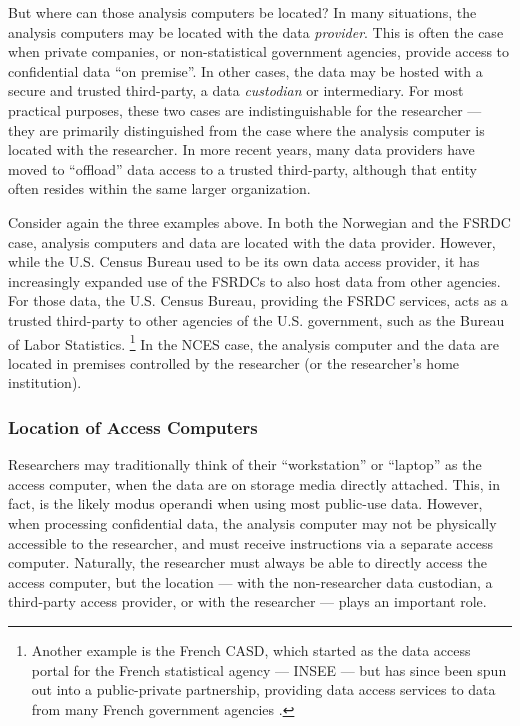 But where can those analysis computers be located? In many situations, the analysis computers may be located with the data \textit{provider}. This is often the case when private companies, or non-statistical government agencies, provide access to confidential data ``on premise''. In other cases, the data may be hosted with a secure and trusted third-party, a data \textit{custodian} or intermediary. For most practical purposes, these two cases are indistinguishable for the researcher --- they are primarily distinguished from the case where the analysis computer is located with the researcher. In more recent years, many data providers have moved to ``offload'' data access to a trusted third-party, although that entity often resides within the same larger organization. 

Consider again the three examples above. In both the Norwegian and the FSRDC case, analysis computers and data are located with the data provider. However, while the U.S. Census Bureau used to be its own data access provider, it has increasingly expanded use of the \acp{FSRDC} to also host data from other agencies. For those data, the U.S. Census Bureau, providing the FSRDC services, acts as a trusted third-party to other agencies of the U.S. government, such as the Bureau of Labor Statistics.%
\footnote{Another example is the French \ac{CASD}, which started as the data access portal for the French statistical agency --- \ac{INSEE} --- but has since been spun out into a public-private partnership, providing data access services to data from many French government agencies \cite{SILBERMAN_2021}.} In the NCES case, the analysis computer and the data are located in premises controlled by the researcher (or the researcher's home institution).

\subsubsection{Location of Access Computers}

Researchers may traditionally think of their ``workstation'' or ``laptop'' as the access computer, when the data are on storage media directly attached. This, in fact, is the likely modus operandi when using most public-use data. However, when processing confidential data,  the analysis computer may not be physically accessible to the researcher, and must receive instructions via a separate access computer. Naturally, the researcher must always be able to directly access the access computer, but the location ---  with the non-researcher data custodian, a third-party access provider, or with the researcher --- plays an important role. 

